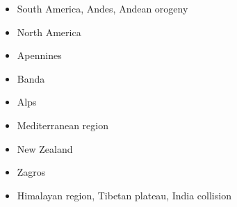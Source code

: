 \begin{itemize}
\item South America, Andes, Andean orogeny 
{\scriptsize
\cite{wdbo94b}
\cite{gusb00}
\cite{vavv02b}
\cite{baso05}\cite{soba05}
\cite{basv06}\cite{meph06}\cite{iabd06}\cite{oncf06}\cite{sobk06}
\cite{iabb07}
\cite{esfm08}\cite{heib08}\cite{iabu08}
\cite{kecw09}\cite{gecm09}
\cite{hucf12}\cite{shlm12}\cite{iadc12}
\cite{waja13}
\cite{cudd15}\cite{ealw15}
\cite{robn16}\cite{marl16}\cite{chdf16}\cite{hulh16}
\cite{sche17}
\cite{yamg19}
}
\item North America 
{\scriptsize
\cite{sabu73}
\cite{huha90}
\cite{bugm97}
\cite{besb06}
\cite{splg08}
\cite{splg09}
\cite{beck12}
\cite{ghbh13}\cite{simi13}
\cite{riag15}
}
\item Apennines 
{\scriptsize
\cite{buwg98}
\cite{shpy07}
\cite{rohu09}
\cite{vami15}
}

\item Banda 
{\scriptsize
\cite{rohu09}
\cite{spha10}
}

\item Alps 
{\scriptsize
\cite{beeh96}
\cite{repe97}
\cite{desw98}
\cite{pfeb00}
\cite{bujl01}
\cite{pfsb02}
\cite{pimo03}
\cite{buge05}
\cite{masp07}
\cite{vifj08}
\cite{luws13}\cite{baes13}
\cite{bubj13}
\cite{bubj14}
\cite{scdu15}\cite{fohk15}
\cite{kids20}
}
\item Mediterranean region 
{\scriptsize
\cite{pimo97}\cite{nesg97}
\cite{nesb99}
\cite{wosp00}
\cite{pimo03}
\cite{wogs09}
\cite{bofb10}\cite{fabe10}
\cite{chsv14}\cite{chsg14}\cite{vavs14}\cite{mafv14}
\cite{mesj16}
\cite{spcv18}
}
\item {New Zealand} 
{\scriptsize
\cite{koon90}
\cite{brbe95}
\cite{bekh96}
\cite{wabb98}
\cite{babr99}
\cite{gedh02}\cite{pybf02}
\cite{gehd03}\cite{konc03}\cite{upke03}
\cite{libi06}
\cite{pyeg10}\cite{spgs10a}
\cite{grel12}
\cite{sths13}
}
\item {Zagros} 
{\scriptsize
\cite{vech06}
\cite{hamo10}
\cite{yakm11}
\cite{nipc13}
\cite{frba14}
\cite{ghbu14}
\cite{coyc16}
\cite{rugb17}
}
\item {Himalayan region, Tibetan plateau, India collision} 


\end{itemize}
